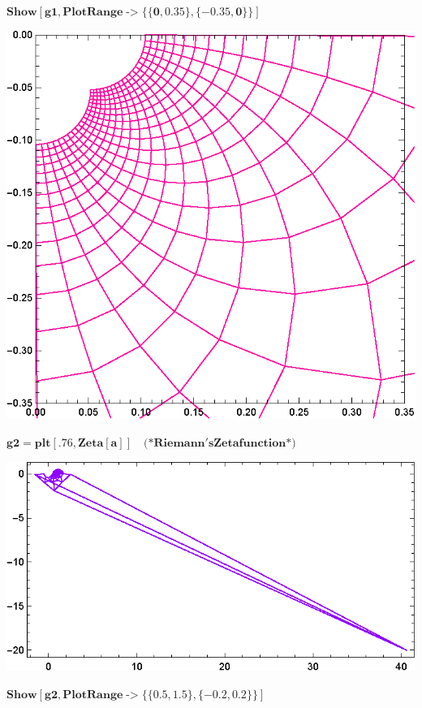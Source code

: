 \documentclass{article}
\begin{document}
\begin{doublespace}
\noindent\(\pmb{\text{Show}[\text{g1},\text{PlotRange}\text{-$>$}\{\{0,0.35\},\{-0.35,0\}\}]}\)
\end{doublespace}

\includegraphics{functions_on_complex-plane_gr6.eps}

\begin{doublespace}
\noindent\(\pmb{\text{g2}=\text{plt}[.76,\text{Zeta}[a]]\quad \text{(*}\text{Riemann}'s \text{Zeta} \text{function}\text{*)}}\)
\end{doublespace}

\includegraphics{functions_on_complex-plane_gr7.eps}

\begin{doublespace}
\noindent\(\pmb{\text{Show}[\text{g2},\text{PlotRange}\text{-$>$}\{\{0.5,1.5\},\{-0.2,0.2\}\}]}\)
\end{doublespace}
\end{document}
